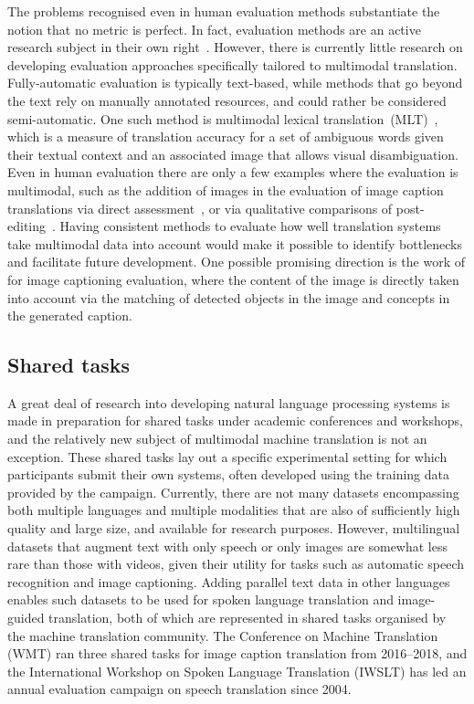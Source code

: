 \documentclass{svjour3}
\begin{document}
        The problems recognised even in human evaluation methods substantiate the notion that no metric is perfect. In fact, evaluation methods are an active research subject in their own right~\citep{specia-findings-2018,ma-results-2018,ma-results-2019}. However, there is currently little research on developing evaluation approaches specifically tailored to multimodal translation. Fully-automatic evaluation is typically text-based, while methods that go beyond the text rely on manually annotated resources, and could rather be considered semi-automatic.
        One such method is multimodal lexical translation~(MLT)~\citep{lala-multimodal-2018}, which is a measure of translation accuracy for a set of ambiguous words given their textual context and an associated image that allows visual disambiguation.
Even in human evaluation there are only a few examples where the evaluation is multimodal, such as the addition of images in the evaluation of image caption translations via direct assessment~\citep{elliott-findings-2017, barrault-findings-2018}, or via qualitative comparisons of post-editing~\citep{frank-assessing-2018}. Having consistent methods to evaluate how well translation systems take multimodal data into account would make it possible to identify bottlenecks and facilitate future development. One possible promising direction is the work of \cite{madhyastha-etal-2019-vifidel} for image captioning evaluation, where the content of the image is directly taken into account via the matching of detected objects in the image and concepts in the generated caption.




    \subsection{Shared tasks}
    \label{sec:eval:tasks}
    
        A great deal of research into developing natural language processing systems is made in preparation for shared tasks under academic conferences and workshops, and the relatively new subject of multimodal machine translation is not an exception. These shared tasks lay out a specific experimental setting for which participants submit their own systems, often developed using the training data provided by the campaign. Currently, there are not many datasets encompassing both multiple languages and multiple modalities that are also of sufficiently high quality and large size, and available for research purposes. However, multilingual datasets that augment text with only speech or only images are somewhat less rare than those with videos, given their utility for tasks such as automatic speech recognition and image captioning. Adding parallel text data in other languages enables such datasets to be used for spoken language translation and image-guided translation, both of which are represented in shared tasks organised by the machine translation community. The Conference on Machine Translation (WMT) ran three shared tasks for image caption translation from 2016--2018, and the International Workshop on Spoken Language Translation (IWSLT) has led an annual evaluation campaign on speech translation since 2004.
            
\end{document}
